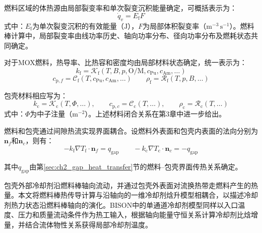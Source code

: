 燃料区域的体热源由局部裂变率和单次裂变沉积能量确定，可概括表示为：
\begin{equation}
	\dot q_v=E_{\mathrm f}F
	\label{eq:ch2_fission_heat_source}
\end{equation}
\noindent 式中：$E_{\mathrm f}$为单次裂变沉积的有效能量（$\mathrm{J}$），$F$为局部体积裂变率（$\mathrm{m^{-3}\,s^{-1}}$）。燃料棒计算中，局部裂变率由线功率历史、轴向功率分布、径向功率分布及燃耗状态共同确定。

对于MOX燃料，热导率、比热容和密度均由局部材料状态确定，统一表示为：
\begin{equation}
	k_{\mathrm f}=\mathcal K_{\mathrm f}
	\left(T,B,p,\mathrm{O/M},c_{\mathrm{Pu}},c_{\mathrm{Am}},\ldots\right)
	\label{eq:ch2_fuel_k_closure}
\end{equation}
\begin{equation}
	c_{\mathrm p,f}=\mathcal C_{\mathrm f}
	\left(T,c_{\mathrm{Pu}},c_{\mathrm{Am}},\ldots\right)
	\qquad
	\rho_{\mathrm f}=\mathcal R_{\mathrm f}\left(T,p,B,\ldots\right)
	\label{eq:ch2_fuel_cp_rho_closure}
\end{equation}

包壳材料相应写为：
\begin{equation}
	k_{\mathrm c}=\mathcal K_{\mathrm c}(T,\varPhi,\ldots),\qquad
	c_{\mathrm p,c}=\mathcal C_{\mathrm c}(T,\ldots),\qquad
	\rho_{\mathrm c}=\mathcal R_{\mathrm c}(T,\ldots)
	\label{eq:ch2_clad_thermal_closure}
\end{equation}
\noindent 式中：$\varPhi$为中子注量（$\mathrm{m^{-2}}$）。上述材料闭合关系在第3章中进一步给出。

燃料和包壳通过间隙热流实现界面耦合。设燃料外表面和包壳内表面的法向分别为$\mathbf n_f$和$\mathbf n_c$，则有：
\begin{equation}
	-k_{\mathrm f}\nabla T_{\mathrm f}\cdot\mathbf n_f=q_{\mathrm{gap}}
	\qquad
	-k_{\mathrm c}\nabla T_{\mathrm c}\cdot\mathbf n_c=-q_{\mathrm{gap}}
	\label{eq:ch2_gap_flux_continuity}
\end{equation}

其中$q_{\mathrm{gap}}$由第\ref{sec:ch2_gap_heat_transfer}节的燃料--包壳界面传热关系确定。

\label{subsec:ch2_coolant_enthalpy}

包壳外部冷却剂沿燃料棒轴向流动，并通过包壳外表面对流换热带走燃料产生的热量。本文将燃料棒热传导计算与沿轴向的一维冷却剂{\rarecharfont 焓}升模型相耦合，以描述冷却剂热力状态沿燃料棒轴向的演化。BISON中的单通道冷却剂模型同样以入口温度、压力和质量流动条件作为热工输入，根据轴向能量守恒关系计算冷却剂比{\rarecharfont 焓}增量，并结合流体物性关系获得局部冷却剂温度\cite{halesBISONTheoryManual2016}。


